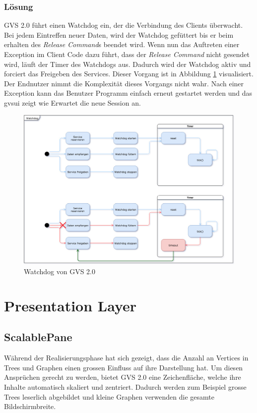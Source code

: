 \documentclass[11pt,a4paper,english,oneside]{book}
\numberwithin{equation}{chapter}
\begin{document}
	\subsubsection{Lösung}
	GVS 2.0 führt einen Watchdog ein, der die Verbindung des Clients überwacht. Bei jedem Eintreffen neuer Daten, wird der Watchdog gefüttert bis er beim erhalten des \textit{Release Command}s beendet wird. Wenn nun das Auftreten einer Exception im Client Code dazu führt, dass der \textit{Release Command} nicht gesendet wird, läuft der Timer des Watchdogs aus. Dadurch wird der Watchdog aktiv und forciert das Freigeben des Services. Dieser Vorgang ist in Abbildung \ref{fig:watchdog} visualisiert.\\
	Der Endnutzer nimmt die Komplexität dieses Vorgangs nicht wahr. Nach einer Exception kann das Benutzer Programm einfach erneut gestartet werden und das \gls{gvsui} zeigt wie Erwartet die neue Session an.
	
	\begin{figure}[h!]
		\centering
		\includegraphics[width=0.7\linewidth]{assets/images/watchdog}
		\caption{Watchdog von GVS 2.0}
		\label{fig:watchdog}
	\end{figure}
	
	
	\section{Presentation Layer}
	
	\subsection{ScalablePane}
	Während der Realisierungsphase hat sich gezeigt, dass die Anzahl an Vertices in Trees und Graphen einen grossen Einfluss auf ihre Darstellung hat. Um diesen Ansprüchen gerecht zu werden, bietet GVS 2.0 eine Zeichenfläche, welche ihre Inhalte automatisch skaliert und zentriert. Dadurch werden zum Beispiel grosse Trees leserlich abgebildet und kleine Graphen verwenden die gesamte Bildschirmbreite. 
	
\end{document}
